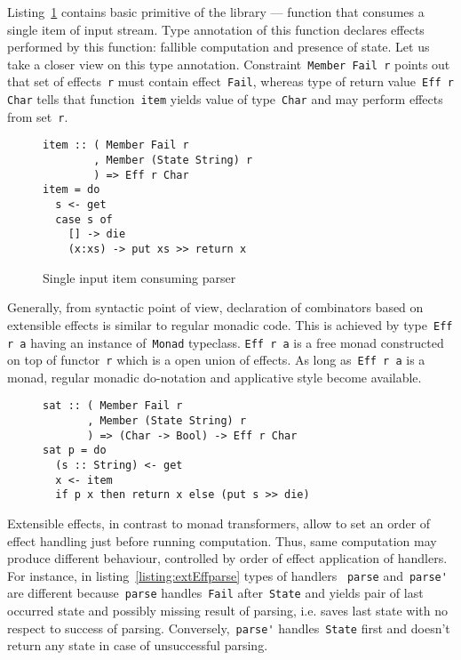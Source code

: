   Listing~\ref{listing:extEffItem} contains basic primitive of the library --- 
  function that consumes a single item of input stream. Type annotation of this 
  function declares effects performed by this function: fallible computation 
  and presence of state. Let us take a closer view on this type annotation.
  Constraint~\lstinline{Member Fail r} points out that set of effects~\lstinline{r}
  must contain effect~\lstinline{Fail}, whereas type of return 
  value~\lstinline{Eff r Char} tells that function~\lstinline{item} yields value
  of type~\lstinline{Char} and may perform effects from set~\lstinline{r}. 

  \begin{figure}[h]
  \begin{lstlisting}
item :: ( Member Fail r
        , Member (State String) r
        ) => Eff r Char
item = do
  s <- get
  case s of
    [] -> die
    (x:xs) -> put xs >> return x
  \end{lstlisting}
  \caption{Single input item consuming parser}
  \label{listing:extEffItem}
  \end{figure}

  Generally, from syntactic point of view, declaration of combinators based on 
  extensible effects is similar to regular monadic code. This is achieved by 
  type~\lstinline{Eff r a} having an instance of~\lstinline{Monad} typeclass.
  \lstinline{Eff r a} is a free monad constructed on top of functor~\lstinline{r}
  which is a open union of effects. As long as~\lstinline{Eff r a} is a monad, 
  regular monadic do-notation and applicative style become available.  

  \begin{figure}[h]
  \begin{lstlisting}
sat :: ( Member Fail r
       , Member (State String) r
       ) => (Char -> Bool) -> Eff r Char
sat p = do
  (s :: String) <- get
  x <- item
  if p x then return x else (put s >> die)
  \end{lstlisting}
  \label{listing:extEffSat}
  \end{figure}

  Extensible effects, in contrast to monad transformers, allow to set an order of 
  effect handling just before running computation. Thus, same computation may 
  produce different behaviour, controlled by order of effect application of 
  handlers. For instance, in listing~\ref{listing:extEffparse} types of handlers 
  ~\lstinline{parse} and~\lstinline{parse'} are different because~\lstinline{parse} 
  handles~\lstinline{Fail} after~\lstinline{State} and yields pair of last occurred 
  state and possibly missing result of parsing, i.e. saves last state with no respect 
  to success of parsing. Conversely,~\lstinline{parse'} handles~\lstinline{State}
  first and doesn't return any state in case of unsuccessful parsing.

